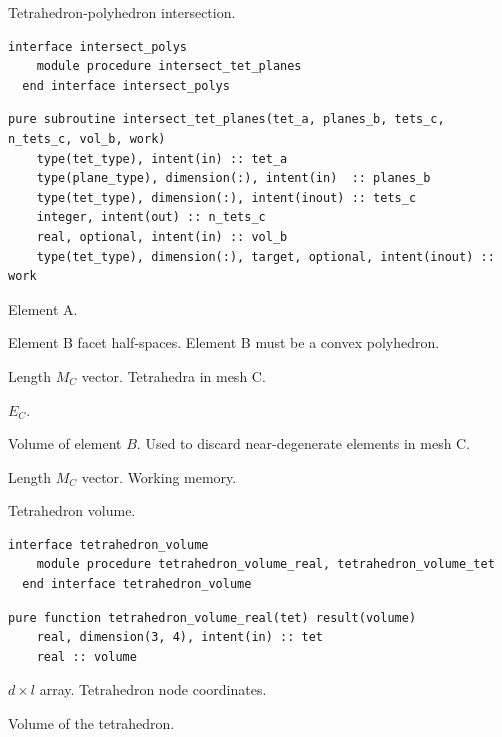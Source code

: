 \documentclass{article}
\begin{document}
\noindent Tetrahedron-polyhedron intersection.

\begin{lstlisting}[language=FORTRAN]
  interface intersect_polys
    module procedure intersect_tet_planes
  end interface intersect_polys
\end{lstlisting}
  
\begin{lstlisting}[language=FORTRAN]
  pure subroutine intersect_tet_planes(tet_a, planes_b, tets_c, n_tets_c, vol_b, work)
    type(tet_type), intent(in) :: tet_a
    type(plane_type), dimension(:), intent(in)  :: planes_b
    type(tet_type), dimension(:), intent(inout) :: tets_c
    integer, intent(out) :: n_tets_c
    real, optional, intent(in) :: vol_b
    type(tet_type), dimension(:), target, optional, intent(inout) :: work
\end{lstlisting}

\begin{description}[font=\ttfamily\bfseries,leftmargin=2.2\parindent,labelindent=1.7\parindent,noitemsep]
  \item[tet\_a] Element A.
  \item[planes\_b] Element B facet half-spaces. Element B must be a convex
    polyhedron.
  \item[tets\_c] Length $M_C$ vector. Tetrahedra in mesh C.
  \item[n\_tets\_c] $E_C$.
  \item[vol\_b] Volume of element $B$. Used to discard near-degenerate elements
    in mesh C.
  \item[work] Length $M_C$ vector. Working memory.
\end{description}

\noindent Tetrahedron volume.

\begin{lstlisting}[language=FORTRAN]
  interface tetrahedron_volume
    module procedure tetrahedron_volume_real, tetrahedron_volume_tet
  end interface tetrahedron_volume
\end{lstlisting}

\begin{lstlisting}[language=FORTRAN]
  pure function tetrahedron_volume_real(tet) result(volume)
    real, dimension(3, 4), intent(in) :: tet
    real :: volume
\end{lstlisting}

\begin{description}[font=\ttfamily\bfseries,leftmargin=2.2\parindent,labelindent=1.7\parindent,noitemsep]
  \item[tet] $d \times l$ array. Tetrahedron node coordinates.
  \item[volume] Volume of the tetrahedron.
\end{description}
\end{document}
